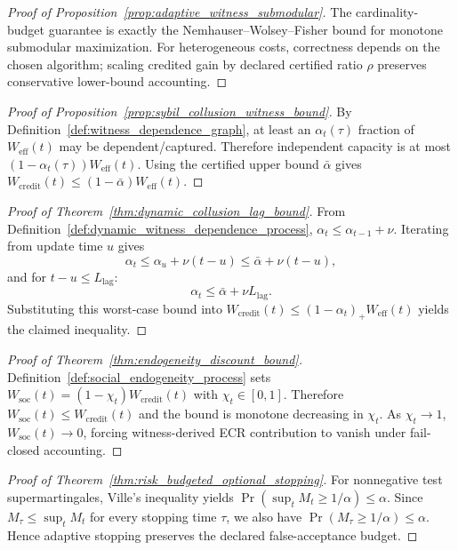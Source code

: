 \documentclass[11pt]{article}
\theoremstyle{definition}
\theoremstyle{plain}
\begin{document}
\begin{proof}[Proof of Proposition~\ref{prop:adaptive_witness_submodular}]
The cardinality-budget guarantee is exactly the Nemhauser--Wolsey--Fisher bound for monotone submodular maximization.
For heterogeneous costs, correctness depends on the chosen algorithm; scaling credited gain by declared certified ratio $\rho$ preserves conservative lower-bound accounting.
\end{proof}

\begin{proof}[Proof of Proposition~\ref{prop:sybil_collusion_witness_bound}]
By Definition~\ref{def:witness_dependence_graph}, at least an $\alpha_t(\tau)$ fraction of $W_{\mathrm{eff}}(t)$ may be dependent/captured.
Therefore independent capacity is at most $(1-\alpha_t(\tau))W_{\mathrm{eff}}(t)$.
Using the certified upper bound $\bar\alpha$ gives $W_{\mathrm{credit}}(t)\le (1-\bar\alpha)W_{\mathrm{eff}}(t)$.
\end{proof}

\begin{proof}[Proof of Theorem~\ref{thm:dynamic_collusion_lag_bound}]
From Definition~\ref{def:dynamic_witness_dependence_process}, $\alpha_t\le \alpha_{t-1}+\nu$.
Iterating from update time $u$ gives
\[
\alpha_t\le \alpha_u+\nu(t-u)\le \bar\alpha+\nu(t-u),
\]
and for $t-u\le L_{\mathrm{lag}}$:
\[
\alpha_t\le \bar\alpha+\nu L_{\mathrm{lag}}.
\]
Substituting this worst-case bound into
$W_{\mathrm{credit}}(t)\le (1-\alpha_t)_+W_{\mathrm{eff}}(t)$
yields the claimed inequality.
\end{proof}

\begin{proof}[Proof of Theorem~\ref{thm:endogeneity_discount_bound}]
Definition~\ref{def:social_endogeneity_process} sets
$W_{\mathrm{soc}}(t)=(1-\chi_t)W_{\mathrm{credit}}(t)$ with $\chi_t\in[0,1]$.
Therefore $W_{\mathrm{soc}}(t)\le W_{\mathrm{credit}}(t)$ and the bound is monotone decreasing in $\chi_t$.
As $\chi_t\to 1$, $W_{\mathrm{soc}}(t)\to 0$, forcing witness-derived ECR contribution to vanish under fail-closed accounting.
\end{proof}

\begin{proof}[Proof of Theorem~\ref{thm:risk_budgeted_optional_stopping}]
For nonnegative test supermartingales, Ville's inequality yields
$\Pr(\sup_t M_t\ge 1/\alpha)\le \alpha$.
Since $M_\tau\le \sup_t M_t$ for every stopping time $\tau$, we also have $\Pr(M_\tau\ge 1/\alpha)\le \alpha$.
Hence adaptive stopping preserves the declared false-acceptance budget.
\end{proof}
\end{document}
